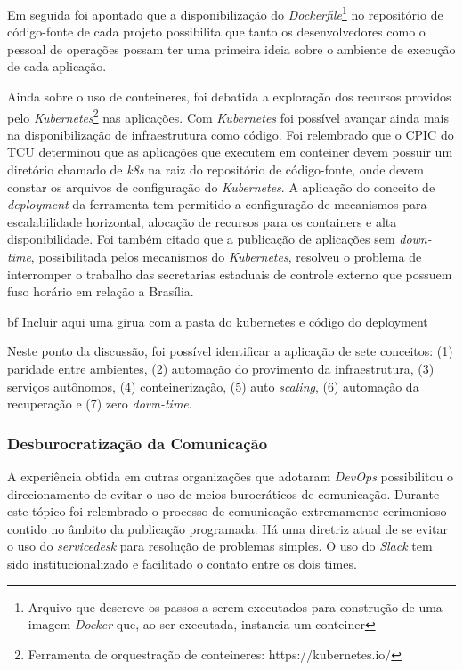 Em seguida foi apontado que a disponibilização do {\it Dockerfile}\footnote{Arquivo
que descreve os passos a serem executados para construção de uma imagem
{\it Docker} que, ao ser executada, instancia um conteiner} no repositório de
código-fonte de cada projeto possibilita que tanto os desenvolvedores como o
pessoal de operações possam ter uma primeira ideia sobre o ambiente de execução
de cada aplicação.

Ainda sobre o uso de conteineres, foi debatida a exploração dos recursos providos
pelo {\it Kubernetes}\footnote{Ferramenta de orquestração de conteineres: https://kubernetes.io/}
nas aplicações. Com {\it Kubernetes} foi possível avançar ainda mais na
disponibilização de infraestrutura como código. Foi relembrado que o \acrfull{CPIC}
do \acrshort{TCU} determinou que as aplicações que executem em conteiner devem
possuir um diretório chamado de \emph{k8s} na raiz do repositório de código-fonte,
onde devem constar os arquivos de configuração do {\it Kubernetes}.
A aplicação do conceito de {\it deployment} da ferramenta tem permitido a
configuração de mecanismos para escalabilidade horizontal, alocação de recursos
para os containers e alta disponibilidade. Foi também citado que a
publicação de aplicações sem {\it down-time}, possibilitada pelos mecanismos do
{\it Kubernetes}, resolveu o problema de interromper o trabalho das secretarias
estaduais de controle externo que possuem fuso horário em relação a Brasília.

{bf Incluir aqui uma girua com a pasta do kubernetes e código do deployment}

Neste ponto da discussão, foi possível identificar a aplicação de sete
conceitos: (1) paridade entre ambientes, (2) automação do provimento da
infraestrutura, (3) serviços autônomos, (4) conteinerização, (5) auto {\it scaling},
(6) automação da recuperação e (7) zero {\it down-time}.

\subsubsection{Desburocratização da Comunicação}

A experiência obtida em outras organizações que adotaram {\it DevOps}
possibilitou o direcionamento de evitar o uso de meios burocráticos de
comunicação. Durante este tópico foi relembrado o processo de comunicação
extremamente cerimonioso contido no âmbito da publicação programada. Há uma
diretriz atual de se evitar o uso do {\it servicedesk} para resolução de
problemas simples. O uso do {\it Slack} tem sido institucionalizado e facilitado
o contato entre os dois times.

